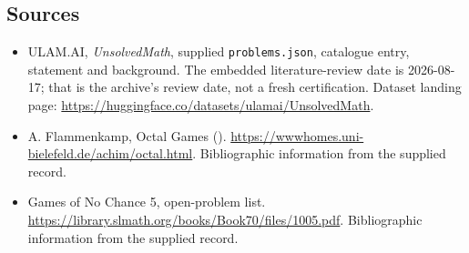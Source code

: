 \documentclass[11pt,a4paper]{article}
\begin{document}
\subsection{Sources}

{\small

\begin{itemize}

\item[\hypertarget{source:statement:1}{S1}] ULAM.AI, \emph{UnsolvedMath}, supplied \texttt{problems.json}, catalogue entry, statement and background. The embedded literature-review date is 2026-08-17; that is the archive’s review date, not a fresh certification. Dataset landing page: \url{https://huggingface.co/datasets/ulamai/UnsolvedMath}.

\item[\hypertarget{source:statement:2}{S2}] A. Flammenkamp, Octal Games (). \url{https://wwwhomes.uni-bielefeld.de/achim/octal.html}. Bibliographic information from the supplied record.

\item[\hypertarget{source:statement:3}{S3}] Games of No Chance 5, open-problem list. \url{https://library.slmath.org/books/Book70/files/1005.pdf}. Bibliographic information from the supplied record.

\end{itemize}

}

\label{end:statement}
\end{document}
